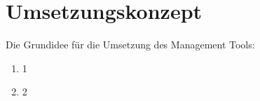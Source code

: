 \section{Umsetzungskonzept}
\label{sec:umsetzung}
Die Grundidee für die Umsetzung des Management Tools:
\begin{enumerate}
	\item 1
	\item 2
\end{enumerate}

